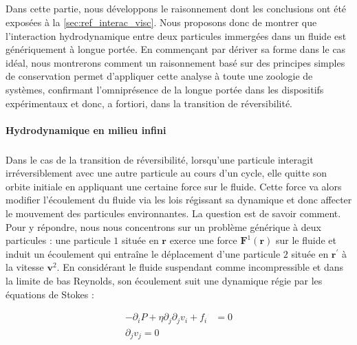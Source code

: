 \label{sec:Annexe_Interactions_Hydro}

\subparagraph{}Dans cette partie, nous développons le raisonnement dont les conclusions ont été exposées à la \autoref{sec:ref_interac_visc}. Nous proposons donc de montrer que l'interaction hydrodynamique entre deux particules immergées dans un fluide est génériquement à longue portée. En commençant par dériver sa forme dans le cas idéal, nous montrerons comment un raisonnement basé sur des principes simples de conservation permet d'appliquer cette analyse à toute une zoologie de systèmes, confirmant l'omniprésence de la longue portée dans les dispositifs expérimentaux et donc, a fortiori, dans la transition de réversibilité.

\paragraph{Hydrodynamique en milieu infini}

\subparagraph{}Dans le cas de la transition de réversibilité, lorsqu'une particule interagit irréversiblement avec une autre particule au cours d'un cycle, elle quitte son orbite initiale en appliquant une certaine force sur le fluide. Cette force va alors modifier l'écoulement du fluide via les lois régissant sa dynamique et donc affecter le mouvement des particules environnantes. La question est de savoir comment. Pour y répondre, nous nous concentrons sur un problème générique à deux particules : une particule $1$ située en $\mathbf{r}$ exerce une force $\mathbf{F}^1(\mathbf{r})$ sur le fluide et induit un écoulement qui entraîne le déplacement d'une particule $2$ située en $\mathbf{r}^\prime$ à la vitesse $\mathbf{v}^2$. En considérant le fluide suspendant comme incompressible et dans la limite de bas Reynolds, son écoulement suit une dynamique régie par les équations de Stokes :

\begin{equation}
\begin{aligned}
	-\partial_i P + \eta \partial_j\partial_j v_i + f_i &= 0 \\
	\partial_j v_j = 0
\end{aligned}
\end{equation}

